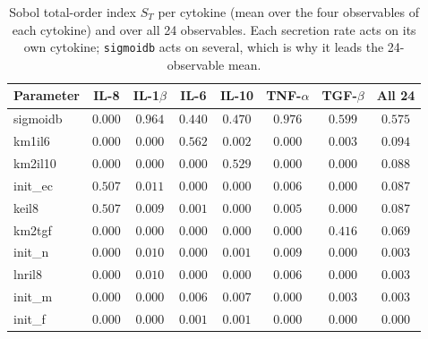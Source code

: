 \begin{table}[!htbp]
\caption{Sobol total-order index $S_T$ per cytokine (mean over the four observables of each cytokine) and over all 24 observables. Each secretion rate acts on its own cytokine; \texttt{sigmoidb} acts on several, which is why it leads the 24-observable mean.}
\label{tab:sobol_per_cytokine}
\centering\footnotesize
\setlength{\tabcolsep}{4pt}
\begin{tabular}{lccccccc}
\toprule
\textbf{Parameter} & \textbf{IL-8} & \textbf{IL-1$\beta$} & \textbf{IL-6} & \textbf{IL-10} & \textbf{TNF-$\alpha$} & \textbf{TGF-$\beta$} & \textbf{All 24} \\
\midrule
sigmoidb & $0.000$ & $0.964$ & $0.440$ & $0.470$ & $0.976$ & $0.599$ & $0.575$ \\
km1il6 & $0.000$ & $0.000$ & $0.562$ & $0.002$ & $0.000$ & $0.003$ & $0.094$ \\
km2il10 & $0.000$ & $0.000$ & $0.000$ & $0.529$ & $0.000$ & $0.000$ & $0.088$ \\
init\_ec & $0.507$ & $0.011$ & $0.000$ & $0.000$ & $0.006$ & $0.000$ & $0.087$ \\
keil8 & $0.507$ & $0.009$ & $0.001$ & $0.000$ & $0.005$ & $0.000$ & $0.087$ \\
km2tgf & $0.000$ & $0.000$ & $0.000$ & $0.000$ & $0.000$ & $0.416$ & $0.069$ \\
init\_n & $0.000$ & $0.010$ & $0.000$ & $0.001$ & $0.009$ & $0.000$ & $0.003$ \\
lnril8 & $0.000$ & $0.010$ & $0.000$ & $0.000$ & $0.006$ & $0.000$ & $0.003$ \\
init\_m & $0.000$ & $0.000$ & $0.006$ & $0.007$ & $0.000$ & $0.003$ & $0.003$ \\
init\_f & $0.000$ & $0.000$ & $0.001$ & $0.001$ & $0.000$ & $0.000$ & $0.000$ \\
\bottomrule
\end{tabular}
\end{table}
